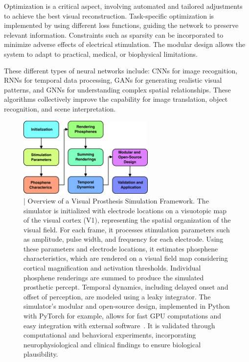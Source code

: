 \documentclass[twocolumn,10pt]{article}
\begin{document}
Optimization is a critical aspect, involving automated and tailored adjustments
to achieve the best visual reconstruction. Task-specific optimization is
implemented by using different loss functions, guiding the network to preserve
relevant information. Constraints such as sparsity can be incorporated to
minimize adverse effects of electrical stimulation. The modular design allows
the system to adapt to practical, medical, or biophysical limitations.

These different types of neural networks include: CNNs for image recognition,
RNNs for temporal data processing, GANs for generating realistic visual
patterns, and GNNs for understanding complex spatial relationships. These
algorithms collectively improve the capability for image translation, object
recognition, and scene interpretation.

\begin{figure}[hbt!]
      \centering
      \includegraphics[width=0.6\textwidth]{imgs/block_diagram_vis_prost.png}
      \caption{| Overview of a Visual Prosthesis Simulation Framework. The
            simulator is initialized with electrode locations on a visuotopic
            map of the visual cortex (V1), representing the spatial organization
            of the visual field. For each frame, it processes stimulation
            parameters such as amplitude, pulse width, and frequency for each
            electrode. Using these parameters and electrode locations, it
            estimates phosphene characteristics, which are rendered on a visual
            field map considering cortical magnification and activation
            thresholds. Individual phosphene renderings are summed to produce
            the simulated prosthetic percept. Temporal dynamics, including
            delayed onset and offset of perception, are modeled using a leaky
            integrator. The simulator's modular and open-source design,
            implemented in Python with PyTorch for example, allows for fast GPU
            computations and easy integration with external
            software~\parencite{deruytervansteveninckEndtoendOptimizationProsthetic2022}.
            It is validated through computational and behavioral experiments,
            incorporating neurophysiological and clinical findings to ensure
            biological plausibility.}\label{fig:simulator_framework}
\end{figure}
\end{document}
